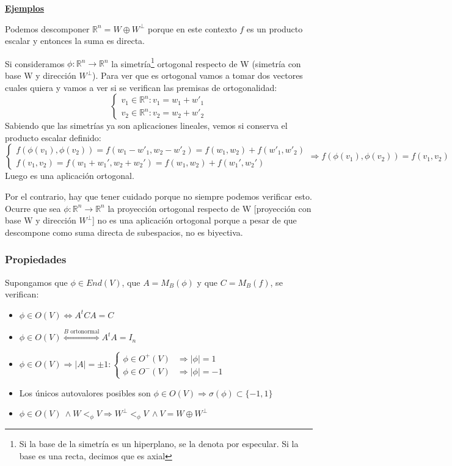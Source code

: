 \documentclass[10pt,a4paper,openright]{book}
\begin{document}
\underline{\textbf{Ejemplos}}

Podemos descomponer $\mathbb{R}^n = W \oplus W^\perp$ porque en este contexto $f$ es un producto escalar y entonces la suma es directa.

Si consideramos $\phi:\mathbb{R}^n  \to \mathbb{R}^n$ la simetría\footnote{Si la base de la simetría es un hiperplano, se la denota por especular. Si la base es una recta, decimos que es axial} ortogonal respecto de W (simetría con base W y dirección $W^\perp$). Para ver que es ortogonal vamos a tomar dos vectores cuales quiera y vamos a ver si se verifican las premisas de ortogonalidad:
$$\begin{cases} v_1 \in \mathbb{R}^n : v_1 = w_1 + w'_1 \\ v_2 \in \mathbb{R}^n : v_2 = w_2 + w'_2 \end{cases}$$
Sabiendo que las simetrías ya son aplicaciones lineales, vemos si conserva el producto escalar definido:
$$\begin{cases} f(\phi(v_1), \phi(v_2)) = f( w_1 - w'_1,w_2 - w'_2) = f(w_1, w_2) + f(w'_1,w'_2) \\ f(v_1, v_2) = f(w_1+w_1', w_2+w_2') = f(w_1, w_2) + f(w_1', w_2') \end{cases}\Rightarrow f(\phi(v_1), \phi(v_2)) = f(v_1, v_2)$$
Luego es una aplicación ortogonal.

Por el contrario, hay que tener cuidado porque no siempre podemos verificar esto. Ocurre que sea $\phi:\mathbb{R}^n  \to \mathbb{R}^n$ la proyección ortogonal respecto de W [proyección con base W y dirección $W^\perp$] no es una aplicación ortogonal porque a pesar de que descompone como suma directa de subespacios, no es biyectiva.

\subsubsection*{Propiedades}
Supongamos que $\phi\in End(V)$, que $A = M_B(\phi)$ y que $C = M_B(f)$, se verifican:
\begin{itemize}
\item $\phi\in O(V)\Leftrightarrow A^t C A = C $

\item $\phi\in O(V) \stackrel{B\mbox{ ortonormal}}{\Leftrightarrow} A^t A = I_n$

\item $\phi \in O(V)\Rightarrow |A| = \pm 1: \begin{cases} \phi \in O^+(V) & \Rightarrow |\phi| = 1 \\ \phi \in O^-(V) & \Rightarrow |\phi| = -1\end{cases}$

\item Los únicos autovalores posibles son $\phi\in O(V)\Rightarrow \sigma(\phi) \subset \{-1, 1\}$

\item $\phi\in O(V) \ \wedge W<_\phi V\Rightarrow W^\perp <_\phi V \ \wedge V = W \oplus W^\perp$
\end{itemize}
\end{document}
